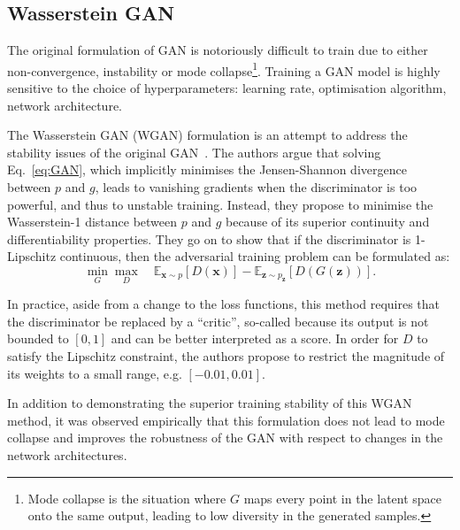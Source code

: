 \subsection{Wasserstein GAN}
The original formulation of GAN is notoriously difficult to train due to either non-convergence, instability or mode collapse\footnote{Mode collapse is the situation where $G$ maps every point in the latent space onto the same output, leading to low diversity in the generated samples.}. 
Training a GAN model is highly sensitive to the choice of hyperparameters: learning rate, optimisation algorithm, network architecture. 

The Wasserstein GAN (WGAN) formulation is an attempt to address the stability issues of the original GAN~\cite{arjovsky2017wasserstein}. The authors argue that solving Eq.~\ref{eq:GAN}, which implicitly minimises the Jensen-Shannon divergence between $p$ and $g$, leads to vanishing gradients when the discriminator is too powerful, and thus to unstable training.
Instead, they propose to minimise the Wasserstein-1 distance between $p$ and $g$ because of its superior continuity and differentiability properties. They go on to show that if the discriminator is 1-Lipschitz continuous, then the adversarial training problem can be formulated as:
\begin{equation}
    \min_G \max_D \quad 
        \mathbb{E}_{\mathbf{x} \sim p} \left[ D(\mathbf{x}) \right] - 
        \mathbb{E}_{\mathbf{z} \sim p_\mathbf{z}} \left[ D(G(\mathbf{z})) \right].
\end{equation}

In practice, aside from a change to the loss functions, this method requires that the discriminator be replaced by a ``critic'', so-called because its output is not bounded to $[0, 1]$ and can be better interpreted as a score. In order for $D$ to satisfy the Lipschitz constraint, the authors propose to restrict the magnitude of its weights to a small range, e.g. $[-0.01, 0.01]$.

In addition to demonstrating the superior training stability of this WGAN method, it was observed empirically that this formulation does not lead to mode collapse and improves the robustness of the GAN with respect to changes in the network architectures.

